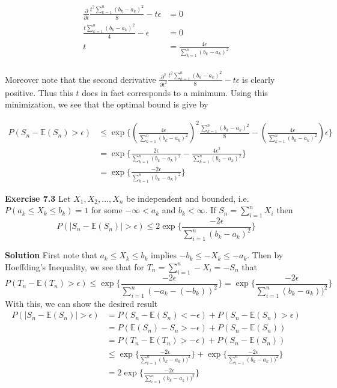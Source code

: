 \documentclass[12pt]{article}  %
\newcommand{\e}{{\epsilon}}
\newcommand{\E}{{\mathbb{E}}}
\begin{document}
\begin{align*}
\frac{\partial}{\partial t}\frac{t^2\sum_{k=1}^{n}(b_k -a_k)^2}{8} - t\e &= 0\\
\frac{t\sum_{k=1}^{n}(b_k -a_k)^2}{4} - \e &= 0\\
t &=\frac{4\e}{\sum_{k=1}^{n}(b_k -a_k)^2} \\
\end{align*}

Moreover note that the second derivative $\frac{\partial^2}{\partial t^2}\frac{t^2\sum_{k=1}^{n}(b_k -a_k)^2}{8} - t\e$ is clearly positive. Thus this $t$ does in fact corresponds to a minimum. Using this minimization, we see that the optimal bound is give by 

\begin{align*}
P(S_n - \E(S_n)>\e)&\leq \exp\bigg\{\left(\frac{4\e}{\sum_{k=1}^{n}(b_k -a_k)^2} \right)^2\frac{\sum_{k=1}^{n}(b_k -a_k)^2}{8} - \left(\frac{4\e}{\sum_{k=1}^{n}(b_k -a_k)^2} \right)\e\bigg\}\\
&= \exp\bigg\{\frac{2\e}{\sum_{k=1}^{n}(b_k -a_k)^2} - \frac{4\e^2}{\sum_{k=1}^{n}(b_k -a_k)^2}\bigg\}\\
&= \exp\bigg\{\frac{-2\e}{\sum_{k=1}^{n}(b_k -a_k)^2}\bigg\}
\end{align*}
\newpage

\textbf{Exercise 7.3} Let $X_1, X_2, \ldots, X_n$ be independent and bounded, i.e. $P(a_k \leq X_k\leq b_k) = 1$ for some $-\infty<a_k$ and $b_k<\infty$. If $S_n = \sum_{i=1}^{n}X_i$ then $$P(|S_n -\E(S_n)|>\e)\leq 2\exp\Big\{\frac{-2\e}{\sum_{i=1}^{n}(b_k-a_k)^2}\Big\}$$

\textbf{Solution} First note that $a_k\leq X_k \leq b_k$ implies $-b_k \leq -X_k \leq -a_k$. Then by Hoeffding's Inequality, we see that for $T_n = \sum_{i=1}^{n}-X_i = -S_n$ that $$P(T_n - \E(T_n)>\e)\leq \exp\Big\{\frac{-2\e}{\sum_{i=1}^{n}(-a_k - (-b_k))^2}\Big\} = \exp\Big\{\frac{-2\e}{\sum_{i=1}^{n}(b_k - a_k))^2}\Big\}$$ With this, we can show the desired result 
\begin{align*}
P(|S_n - \E(S_n)|>\e) &= P(S_n -\E(S_n)<-\e) + P(S_n - \E(S_n)>\e)\\
&= P(\E(S_n) - S_n > -\e) + P(S_n - \E(S_n))\\
&= P(T_n - \E(T_n) > -\e) + P(S_n - \E(S_n))\\
&\leq \exp\Big\{\frac{-2\e}{\sum_{i=1}^{n}(b_k - a_k))^2}\Big\} + \exp\Big\{\frac{-2\e}{\sum_{i=1}^{n}(b_k - a_k))^2}\Big\}\\
&= 2\exp\Big\{\frac{-2\e}{\sum_{i=1}^{n}(b_k - a_k))^2}\Big\}
\end{align*}
\end{document}
